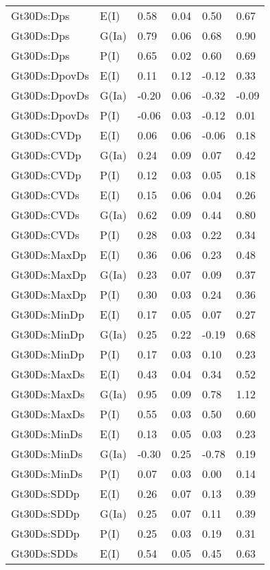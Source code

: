 \begin{center}
\begin{longtable}{|p{1.1in}|p{0.7in}|p{0.7in}|p{0.6in}|p{0.6in}|p{0.6in}|}
  Gt30Ds:Dps & E(I) & 0.58 & 0.04 & 0.50 & 0.67 \\ 
  Gt30Ds:Dps & G(Ia) & 0.79 & 0.06 & 0.68 & 0.90 \\ 
  Gt30Ds:Dps & P(I) & 0.65 & 0.02 & 0.60 & 0.69 \\ 
  Gt30Ds:DpovDs & E(I) & 0.11 & 0.12 & -0.12 & 0.33 \\ 
  Gt30Ds:DpovDs & G(Ia) & -0.20 & 0.06 & -0.32 & -0.09 \\ 
  Gt30Ds:DpovDs & P(I) & -0.06 & 0.03 & -0.12 & 0.01 \\ 
  Gt30Ds:CVDp & E(I) & 0.06 & 0.06 & -0.06 & 0.18 \\ 
  Gt30Ds:CVDp & G(Ia) & 0.24 & 0.09 & 0.07 & 0.42 \\ 
  Gt30Ds:CVDp & P(I) & 0.12 & 0.03 & 0.05 & 0.18 \\ 
  Gt30Ds:CVDs & E(I) & 0.15 & 0.06 & 0.04 & 0.26 \\ 
  Gt30Ds:CVDs & G(Ia) & 0.62 & 0.09 & 0.44 & 0.80 \\ 
  Gt30Ds:CVDs & P(I) & 0.28 & 0.03 & 0.22 & 0.34 \\ 
  Gt30Ds:MaxDp & E(I) & 0.36 & 0.06 & 0.23 & 0.48 \\ 
  Gt30Ds:MaxDp & G(Ia) & 0.23 & 0.07 & 0.09 & 0.37 \\ 
  Gt30Ds:MaxDp & P(I) & 0.30 & 0.03 & 0.24 & 0.36 \\ 
  Gt30Ds:MinDp & E(I) & 0.17 & 0.05 & 0.07 & 0.27 \\ 
  Gt30Ds:MinDp & G(Ia) & 0.25 & 0.22 & -0.19 & 0.68 \\ 
  Gt30Ds:MinDp & P(I) & 0.17 & 0.03 & 0.10 & 0.23 \\ 
  Gt30Ds:MaxDs & E(I) & 0.43 & 0.04 & 0.34 & 0.52 \\ 
  Gt30Ds:MaxDs & G(Ia) & 0.95 & 0.09 & 0.78 & 1.12 \\ 
  Gt30Ds:MaxDs & P(I) & 0.55 & 0.03 & 0.50 & 0.60 \\ 
  Gt30Ds:MinDs & E(I) & 0.13 & 0.05 & 0.03 & 0.23 \\ 
  Gt30Ds:MinDs & G(Ia) & -0.30 & 0.25 & -0.78 & 0.19 \\ 
  Gt30Ds:MinDs & P(I) & 0.07 & 0.03 & 0.00 & 0.14 \\ 
  Gt30Ds:SDDp & E(I) & 0.26 & 0.07 & 0.13 & 0.39 \\ 
  Gt30Ds:SDDp & G(Ia) & 0.25 & 0.07 & 0.11 & 0.39 \\ 
  Gt30Ds:SDDp & P(I) & 0.25 & 0.03 & 0.19 & 0.31 \\ 
  Gt30Ds:SDDs & E(I) & 0.54 & 0.05 & 0.45 & 0.63 \\ 

\end{longtable}
\end{center}
